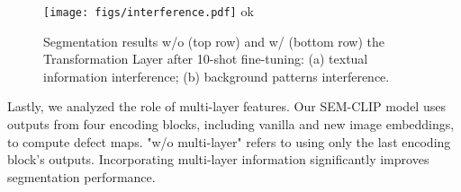 \begin{figure}[tb!]
    \centering
    \texttt{[image: figs/interference.pdf]}
ok    \caption{Segmentation results w/o (top row) and w/ (bottom row) the Transformation Layer after 10-shot fine-tuning: (a) textual information interference; (b) background patterns interference.}
    \label{fig:interference}
\end{figure}


 Lastly, we analyzed the role of multi-layer features. Our SEM-CLIP model uses outputs from four encoding blocks, including vanilla and new image embeddings, to compute defect maps. "w/o multi-layer" refers to using only the last encoding block’s outputs. Incorporating multi-layer information significantly improves segmentation performance.


